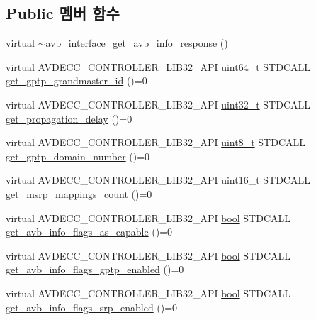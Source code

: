 \subsection*{Public 멤버 함수}
\begin{DoxyCompactItemize}
\item 
virtual \hyperlink{classavdecc__lib_1_1avb__interface__get__avb__info__response_a16f23e9aedce7db6a04040684a9d6f4c}{$\sim$avb\+\_\+interface\+\_\+get\+\_\+avb\+\_\+info\+\_\+response} ()
\item 
virtual A\+V\+D\+E\+C\+C\+\_\+\+C\+O\+N\+T\+R\+O\+L\+L\+E\+R\+\_\+\+L\+I\+B32\+\_\+\+A\+PI \hyperlink{parse_8c_aec6fcb673ff035718c238c8c9d544c47}{uint64\+\_\+t} S\+T\+D\+C\+A\+LL \hyperlink{classavdecc__lib_1_1avb__interface__get__avb__info__response_a9a1f74c17f1a794b244945556713f6cd}{get\+\_\+gptp\+\_\+grandmaster\+\_\+id} ()=0
\item 
virtual A\+V\+D\+E\+C\+C\+\_\+\+C\+O\+N\+T\+R\+O\+L\+L\+E\+R\+\_\+\+L\+I\+B32\+\_\+\+A\+PI \hyperlink{parse_8c_a6eb1e68cc391dd753bc8ce896dbb8315}{uint32\+\_\+t} S\+T\+D\+C\+A\+LL \hyperlink{classavdecc__lib_1_1avb__interface__get__avb__info__response_a188c53e804e82e99ff100d0af99f70f7}{get\+\_\+propagation\+\_\+delay} ()=0
\item 
virtual A\+V\+D\+E\+C\+C\+\_\+\+C\+O\+N\+T\+R\+O\+L\+L\+E\+R\+\_\+\+L\+I\+B32\+\_\+\+A\+PI \hyperlink{stdint_8h_aba7bc1797add20fe3efdf37ced1182c5}{uint8\+\_\+t} S\+T\+D\+C\+A\+LL \hyperlink{classavdecc__lib_1_1avb__interface__get__avb__info__response_ae95507507837659c46bbfa2732a243f9}{get\+\_\+gptp\+\_\+domain\+\_\+number} ()=0
\item 
virtual A\+V\+D\+E\+C\+C\+\_\+\+C\+O\+N\+T\+R\+O\+L\+L\+E\+R\+\_\+\+L\+I\+B32\+\_\+\+A\+PI uint16\+\_\+t S\+T\+D\+C\+A\+LL \hyperlink{classavdecc__lib_1_1avb__interface__get__avb__info__response_a63ffcdd29388ba0652e958de4eec227b}{get\+\_\+msrp\+\_\+mappings\+\_\+count} ()=0
\item 
virtual A\+V\+D\+E\+C\+C\+\_\+\+C\+O\+N\+T\+R\+O\+L\+L\+E\+R\+\_\+\+L\+I\+B32\+\_\+\+A\+PI \hyperlink{avb__gptp_8h_af6a258d8f3ee5206d682d799316314b1}{bool} S\+T\+D\+C\+A\+LL \hyperlink{classavdecc__lib_1_1avb__interface__get__avb__info__response_a389fb2228a18f440d84761b5a5104f9e}{get\+\_\+avb\+\_\+info\+\_\+flags\+\_\+as\+\_\+capable} ()=0
\item 
virtual A\+V\+D\+E\+C\+C\+\_\+\+C\+O\+N\+T\+R\+O\+L\+L\+E\+R\+\_\+\+L\+I\+B32\+\_\+\+A\+PI \hyperlink{avb__gptp_8h_af6a258d8f3ee5206d682d799316314b1}{bool} S\+T\+D\+C\+A\+LL \hyperlink{classavdecc__lib_1_1avb__interface__get__avb__info__response_a854fa1df8f258747954198e425db94e6}{get\+\_\+avb\+\_\+info\+\_\+flags\+\_\+gptp\+\_\+enabled} ()=0
\item 
virtual A\+V\+D\+E\+C\+C\+\_\+\+C\+O\+N\+T\+R\+O\+L\+L\+E\+R\+\_\+\+L\+I\+B32\+\_\+\+A\+PI \hyperlink{avb__gptp_8h_af6a258d8f3ee5206d682d799316314b1}{bool} S\+T\+D\+C\+A\+LL \hyperlink{classavdecc__lib_1_1avb__interface__get__avb__info__response_afb7a3377753771909265e2c78037afaa}{get\+\_\+avb\+\_\+info\+\_\+flags\+\_\+srp\+\_\+enabled} ()=0
\end{DoxyCompactItemize}


